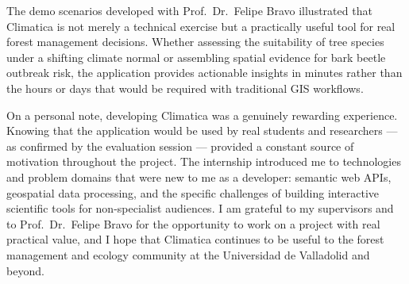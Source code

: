 The demo scenarios developed with Prof.\ Dr.\ Felipe Bravo illustrated that
Climatica is not merely a technical exercise but a practically useful tool
for real forest management decisions. Whether assessing the suitability of
tree species under a shifting climate normal or assembling spatial evidence
for bark beetle outbreak risk, the application provides actionable insights
in minutes rather than the hours or days that would be required with
traditional GIS workflows.

On a personal note, developing Climatica was a genuinely rewarding experience.
Knowing that the application would be used by real students and researchers ---
as confirmed by the evaluation session --- provided a constant source of
motivation throughout the project. The internship introduced me to technologies
and problem domains that were new to me as a developer: semantic web APIs,
geospatial data processing, and the specific challenges of building interactive
scientific tools for non-specialist audiences. I am grateful to my supervisors
and to Prof.\ Dr.\ Felipe Bravo for the opportunity to work on a project with
real practical value, and I hope that Climatica continues to be useful to the
forest management and ecology community at the Universidad de Valladolid and
beyond.